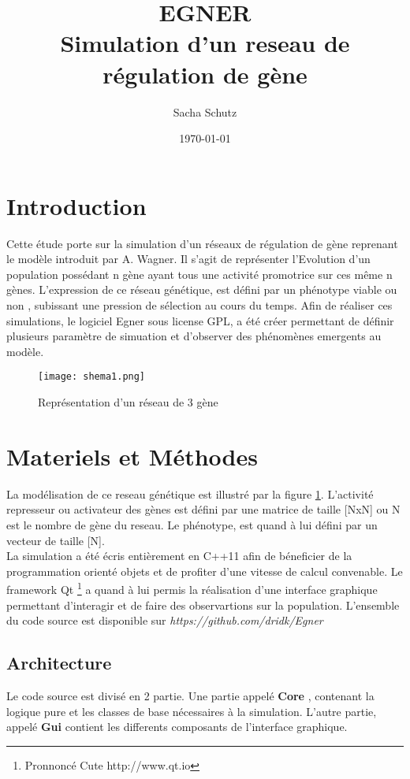 \documentclass{article}
\title {EGNER\\ Simulation d'un reseau de régulation de gène}
\author {Sacha Schutz}
\date {\today}
\begin{document}
	\maketitle

	\section{Introduction} %
	Cette étude porte sur la simulation d'un réseaux de régulation de gène reprenant le modèle introduit par A. Wagner. Il s'agit de représenter l'Evolution d'un population possédant n gène ayant tous une activité promotrice sur ces même n gènes. L'expression de ce réseau génétique, est défini par un phénotype viable ou non , subissant une pression de sélection au cours du temps. Afin de réaliser ces simulations, le logiciel Egner sous license GPL, a été créer permettant de définir plusieurs paramètre de simuation et d'observer des phénomènes emergents au modèle.

	\begin{figure}[h]
	\label{figure1}
	\caption[test]{Représentation d'un réseau de 3 gène }
	\centering
	\texttt{[image: shema1.png]}
	\end{figure}

	\section{Materiels et Méthodes} 
	La modélisation de ce reseau génétique est illustré par la figure \ref{figure1}. L'activité represseur ou activateur des gènes est défini par une matrice de taille [NxN] ou N est le nombre de gène du reseau. Le phénotype, est quand à lui défini par un vecteur de taille [N]. \\
	La simulation a été écris entièrement en C++11 afin de béneficier de la programmation orienté objets et de profiter d'une vitesse de calcul convenable. Le framework Qt \footnote{Pronnoncé Cute  http://www.qt.io} a quand à lui permis la réalisation d'une interface graphique permettant d'interagir et de faire des observartions sur la population. L'ensemble du code source est disponible sur \emph{https://github.com/dridk/Egner}
	\subsection {Architecture}
	Le code source est divisé en 2 partie. Une partie appelé \textbf{Core} , contenant la logique pure et les classes de base nécessaires à la simulation. L'autre partie, appelé \textbf{Gui} contient les differents composants de l'interface graphique.
\end{document}
